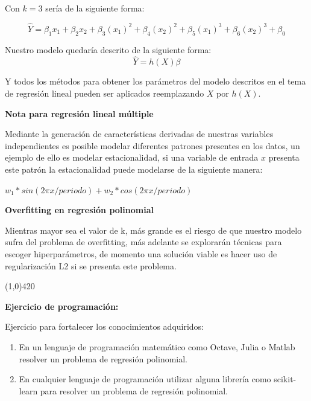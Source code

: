 \documentclass[11pt,fleqn]{book} %
\begin{document}
Con $k=3$ sería de la siguiente forma:

\begin{equation}
\label{eqn:linear_regression_mod2}
\hat{Y}  = \beta _1 x_1 + \beta _2 x_2 + \beta _3 (x_1)^2 + \beta _4 (x_2)^2 + \beta _5 (x_1)^3 + \beta _6 (x_2)^3 +\beta _0
\end{equation}

Nuestro modelo quedaría descrito de la siguiente forma:
\begin{equation}
\label{eqn:linear_regression_vec_mod3}
\hat{Y}  = h(X) \beta
\end{equation}

Y todos los métodos para obtener los parámetros del modelo descritos en el tema de regresión lineal pueden ser aplicados reemplazando $X$ por $h(X)$.

\textbf{Nota para regresión lineal múltiple}

Mediante la generación de características derivadas de nuestras variables independientes es posible modelar diferentes patrones presentes en los datos, un ejemplo de ello es modelar estacionalidad, si una variable de entrada $x$ presenta este patrón la estacionalidad puede modelarse de la siguiente manera:

$w_1*sin(2\pi x/ periodo) + w_2*cos(2\pi x/ periodo)$

\textbf{Overfitting en regresión polinomial}

Mientras mayor sea el valor de k, más grande es el riesgo de que nuestro modelo sufra del problema de overfitting, más adelante se explorarán técnicas para escoger hiperparámetros, de momento una solución viable es hacer uso de regularización L2 si se presenta este problema.

\begin{center}
\line(1,0){420}
\end{center}

\textbf{Ejercicio de programación:}

Ejercicio para fortalecer los conocimientos adquiridos:

\begin{enumerate}
\item En un lenguaje de programación matemático como Octave, Julia o Matlab resolver un problema de regresión polinomial.
\item En cualquier lenguaje de programación utilizar alguna librería como scikit-learn para resolver un problema de regresión polinomial.
\end{enumerate}
\end{document}
